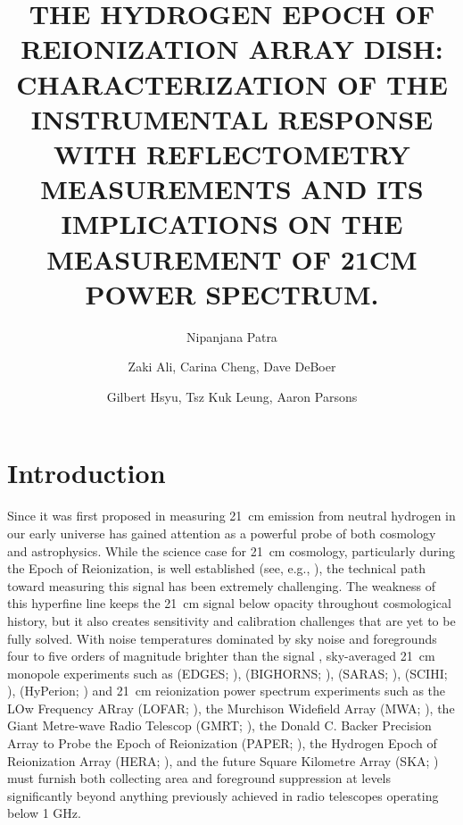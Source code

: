 \documentclass[twocolumn]{emulateapj}
\begin{document}
\title{THE HYDROGEN EPOCH OF REIONIZATION ARRAY DISH: CHARACTERIZATION OF  THE INSTRUMENTAL RESPONSE WITH REFLECTOMETRY MEASUREMENTS AND ITS IMPLICATIONS ON THE MEASUREMENT OF 21CM POWER SPECTRUM. } 

\author{Nipanjana Patra }
\author{Zaki Ali, Carina Cheng, Dave DeBoer}
\author{Gilbert Hsyu, Tsz Kuk Leung, Aaron Parsons}

\begin{abstract}
\end{abstract}


\section{Introduction}

Since it was first proposed in \citep{Shaver_et_al1999} measuring 21~cm
emission from neutral hydrogen in our early universe has gained attention as a
powerful probe of both cosmology and astrophysics.  While the science case for
21~cm cosmology, particularly during the Epoch of Reionization, is well
established (see, e.g.,
\citep{furlanetto_et_al2006,morales_wyithe2010,pritchard_loeb2012}),
the technical path toward measuring this signal has been extremely challenging.  The
weakness of this hyperfine line keeps the 21~cm signal below opacity throughout
cosmological history, but it also creates sensitivity and calibration
challenges that are yet to be fully solved.  With noise temperatures dominated
by sky noise \citep{XXX} and foregrounds four to five orders of magnitude
brighter than the signal \citep{XXX}, 
sky-averaged 21~cm monopole experiments such as
(EDGES; \citealt{XXX}),
(BIGHORNS; \citealt{XXX}),
(SARAS; \citealt{patra_et_al2014}),
(SCIHI; \citealt{voytek_et_al2014}),
(HyPerion; \citealt{presley_et_al2015})
and 21~cm reionization power spectrum experiments such as
the LOw Frequency ARray (LOFAR; \citealt{XXX}),
the Murchison Widefield Array (MWA; \citealt{XXX}),
the Giant Metre-wave Radio Telescop (GMRT; \citealt{XXX}),
the Donald C. Backer Precision Array to Probe the Epoch of Reionization (PAPER; \citealt{parsons_et_al2010}),
the Hydrogen Epoch of Reionization Array (HERA; \citealt{XXX}),
and the future Square Kilometre Array (SKA; \citealt{XXX})
must
furnish both collecting area and foreground suppression at levels significantly
beyond anything previously achieved in radio telescopes operating below 1 GHz.
\end{document}
